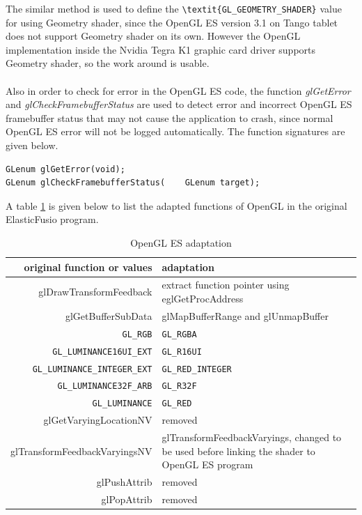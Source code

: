 \documentclass[12pt,twoside]{article}
\begin{document}
The similar method is used to define the \verb|\textit{GL_GEOMETRY_SHADER}| value for using Geometry shader, since the OpenGL ES version 3.1 on Tango tablet does not support Geometry shader on its own. However the OpenGL implementation inside the Nvidia Tegra K1 graphic card driver supports Geometry shader, so the work around is usable.\\
\\
Also in order to check for error in the OpenGL ES code, the function \textit{glGetError} and \textit{glCheckFramebufferStatus} are used to detect error and incorrect OpenGL ES framebuffer status that may not cause the application to crash, since normal OpenGL ES error will not be logged automatically. The function signatures are given below.\\
\begin{lstlisting}
GLenum glGetError(void);
GLenum glCheckFramebufferStatus(	GLenum target);
\end{lstlisting}
A table \ref{table:OpenGL ES adaptation} is given below to list the adapted functions of OpenGL in the original ElasticFusio program.

\begin{table}
\centering
\caption{OpenGL ES adaptation}
\label{table:OpenGL ES adaptation}
\begin{tabular}{|r|l|}
  \hline
  original function or values & adaptation \\
  \hline
 glDrawTransformFeedback & extract function pointer using eglGetProcAddress\\
 \hline
 glGetBufferSubData  &  glMapBufferRange and glUnmapBuffer \\
 \hline
   \verb|GL_RGB|  & \verb|GL_RGBA| \\
   \hline
\verb|GL_LUMINANCE16UI_EXT| &  \verb|GL_R16UI| \\
\hline
  \verb|GL_LUMINANCE_INTEGER_EXT|  &  \verb|GL_RED_INTEGER| \\
  \hline
\verb|GL_LUMINANCE32F_ARB| &  \verb|GL_R32F| \\
\hline
  \verb|GL_LUMINANCE| & \verb|GL_RED| \\
  \hline
  glGetVaryingLocationNV & removed \\ 
  \hline
  glTransformFeedbackVaryingsNV & glTransformFeedbackVaryings, changed to be used before linking the shader to OpenGL ES program\\
  \hline
 glPushAttrib & removed \\
 \hline
 glPopAttrib & removed\\
    \hline
\end{tabular}
\end{table}
\end{document}
